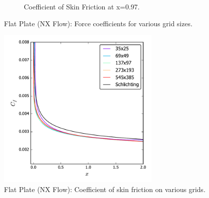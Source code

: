 \begin{figure}[ht!]
\begin{subfigure}{.45\textwidth}
  \caption{Coefficient of Skin Friction at x=0.97.}
\end{subfigure}
\caption{Flat Plate (NX Flow): Force coefficients for various grid sizes.}
\label{fig:nxflatforcestudy}
\end{figure}

\begin{figure}[ht!]
\centering
  \includegraphics[width=0.7\textwidth]{figs/flatnx/cf_gridstudy.pdf}
  \caption{Flat Plate (NX Flow): Coefficient of skin friction on various grids.}
  \label{fig:nxflatcfstudy}
\end{figure}

